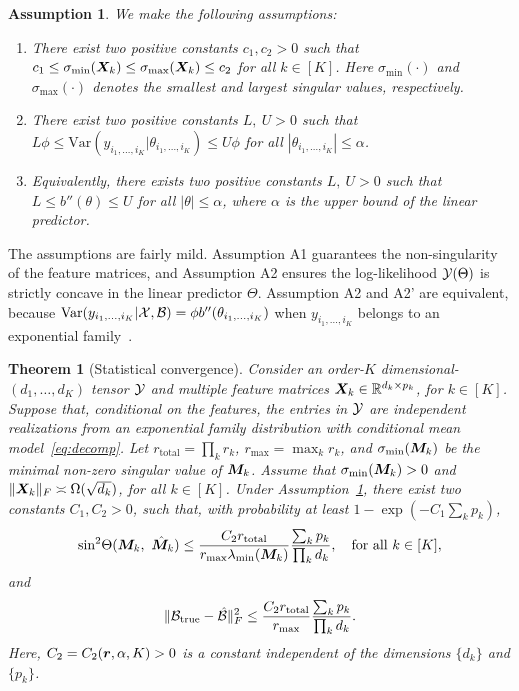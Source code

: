 \documentclass[12pt]{article}
\theoremstyle{plain}
\newtheorem{thm}{Theorem}[section]
\newtheorem{assumption}{Assumption}
\theoremstyle{definition}
\begin{document}
\begin{assumption}\label{ass}We make the following assumptions:
\begin{enumerate}
\item [A1.] There exist two positive constants $c_1, c_2>0$ such that $c_1\leq \sigma_{\min}(\bm X_k)\leq  \sigma_{\max}(\bm X_k)\leq c_2$ for all $k\in[K]$. Here $\sigma_{\text{min}}(\cdot)$ and $\sigma_{\text{max}}(\cdot)$ denotes the smallest and largest singular values, respectively.
\item [A2.] There exist two positive constants $L,\ U>0$ such that $L\phi \leq \text{Var}(y_{i_1,\ldots,i_K}|\theta_{i_1,\ldots,i_K})\leq U\phi $ for all $|\theta_{i_1,\ldots,i_K}|\leq \alpha$.
\item[A2'.] Equivalently, there exists two positive constants $L,\ U>0$ such that $L\leq b''(\theta) \leq U$ for all $|\theta|\leq \alpha$, where $\alpha$ is the upper bound of the linear predictor. 

\end{enumerate}
\end{assumption}
The assumptions are fairly mild. Assumption A1 guarantees the non-singularity of the feature matrices, and Assumption A2 ensures the log-likelihood $\mathcal{Y}(\Theta)$ is strictly concave in the linear predictor $\Theta$. Assumption A2 and A2' are equivalent, because $\text{Var}(y_{i_1,\ldots,i_K}|\mathcal{X},\mathcal{B})=\phi b''(\theta_{i_1,\ldots,i_K})$ when $y_{i_1,\ldots,i_K}$ belongs to an exponential family~\citep{mccullagh1989generalized}. 

  
\begin{thm}[Statistical convergence]\label{thm:main}
Consider an order-$K$ dimensional-$(d_1,\ldots,d_K)$ tensor $\mathcal{Y}$ and multiple feature matrices $\bm X_k\in\mathbb{R}^{d_k\times p_k}$, for $k\in[K]$. Suppose that, conditional on the features, the entries in $\mathcal{Y}$ are independent realizations from an exponential family distribution with conditional mean model~\eqref{eq:decomp}. Let $r_\text{total}=\prod_k r_k$, $r_{\max}=\max_k r_k$, and $\sigma_{\min}(\bm M_k)$ be the minimal non-zero singular value of $\bm M_k$. Assume that $\sigma_{\min}(\bm M_k)>0$ and $\lVert\bm X_k\rVert_F \asymp \Omega(\sqrt{d_k})$, for all $k\in[K]$. Under Assumption~\ref{ass}, there exist two constants $C_1, C_2>0$, such that, with probability at least $1-\exp(-C_1\sum_k p_k)$, 
\begin{equation}\label{eq:bound}
\textup{sin}^2 \Theta(\bm M_k,\ \hat {\bm M}_k) \leq  \frac{ C_{2}r_{\textup{total}}}{ r_{\max}\lambda_{\min}(\bm M_k)}\frac{\sum_k p_k}{\prod_k d_k}, \quad\text{for all }k\in[K],
\end{equation}
and
\[
\lVert\mathcal{B}_{\text{true}}- \hat {\mathcal{B}}\rVert_F^2\leq \frac{ C_{2} r_{\textup{total}}}{r_{\max}}\frac{\sum_k p_k}{\prod_k d_k}.
\]
Here, $C_2=C_2(\bm{r},\alpha, K)>0$ is a constant independent of the dimensions $\{d_k\}$ and $\{p_k\}$. 
\end{thm}
\end{document}
